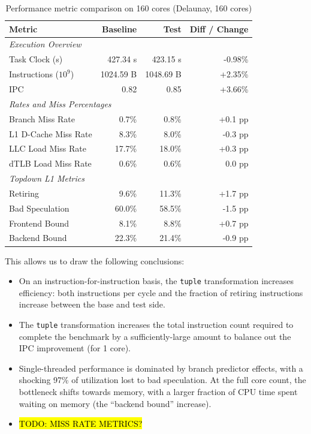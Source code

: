 \documentclass[leqno,11pt]{article}
\begin{document}
\begin{table}[htbp]
  \centering
  \caption{Performance metric comparison on 160 cores (Delaunay, 160 cores)}
  \label{tab:perf_comparison_delaunay_160cores}
  \begin{tabular}{lrrr}
    \toprule
    \textbf{Metric} & \textbf{Baseline} & \textbf{Test} & \textbf{Diff / Change} \\
    \midrule
    \multicolumn{4}{l}{\textit{Execution Overview}} \\
    \quad Task Clock (s)           & 427.34 s   & 423.15 s   & -0.98\%   \\
    \quad Instructions ($10^9$)    & 1024.59 B  & 1048.69 B  & +2.35\%   \\
    \quad IPC                      & 0.82       & 0.85       & +3.66\%   \\
    \midrule
    \multicolumn{4}{l}{\textit{Rates and Miss Percentages}} \\
    \quad Branch Miss Rate         & 0.7\%      & 0.8\%      & +0.1 pp   \\
    \quad L1 D-Cache Miss Rate     & 8.3\%      & 8.0\%      & -0.3 pp   \\
    \quad LLC Load Miss Rate       & 17.7\%     & 18.0\%     & +0.3 pp   \\
    \quad dTLB Load Miss Rate      & 0.6\%      & 0.6\%      & 0.0 pp    \\
    \midrule
    \multicolumn{4}{l}{\textit{Topdown L1 Metrics}} \\
    \quad Retiring                 & 9.6\%      & 11.3\%     & +1.7 pp   \\
    \quad Bad Speculation          & 60.0\%     & 58.5\%     & -1.5 pp   \\
    \quad Frontend Bound           & 8.1\%      & 8.8\%      & +0.7 pp   \\
    \quad Backend Bound            & 22.3\%     & 21.4\%     & -0.9 pp   \\
    \bottomrule
  \end{tabular}
\end{table}
This allows us to draw the following conclusions:
\begin{itemize}
\item On an instruction-for-instruction basis, the \texttt{tuple} transformation
  increases efficiency: both instructions per cycle and the fraction of retiring
  instructions increase between the base and test side.
\item The \texttt{tuple} transformation increases the total instruction count
  required to complete the benchmark by a sufficiently-large amount to balance
  out the IPC improvement (for 1 core).
\item Single-threaded performance is dominated by branch predictor effects, with
  a shocking 97\% of utilization lost to bad speculation. At the full core
  count, the bottleneck shifts towards memory, with a larger fraction of CPU
  time spent waiting on memory (the ``backend bound'' increase).
\item \hl{TODO: MISS RATE METRICS?}
\end{itemize}
\end{document}
